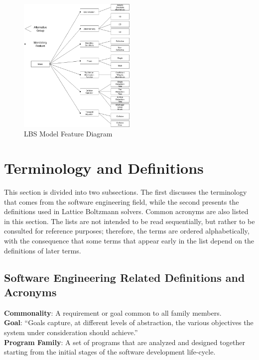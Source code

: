 \documentclass[12pt]{article}
\begin{document}
\begin{figure}[h!]
	\begin{center}
		\includegraphics[width=0.5\textwidth]{FeatureDiagramLBS}
		\caption{LBS Model Feature Diagram}
		\label{LBSFeatureDiagram}
	\end{center}
\end{figure} 

\newpage
\section{Terminology and Definitions}
This section is divided into two subsections. The first discusses the terminology that comes from the software engineering field, while the second presents the definitions used in Lattice Boltzmann solvers. Common acronyms are also listed in this section. The lists are not intended to be read sequentially, but rather to be consulted for reference purposes; therefore, the terms are ordered alphabetically, with the consequence that some terms that appear early in the list depend on the definitions of later terms.

\subsection{Software Engineering Related Definitions and Acronyms}
\noindent\textbf{Commonality}: A requirement or goal common to all family members.\\

\noindent\textbf{Goal}: “Goals capture, at different levels of abstraction, the various objectives the system under consideration should achieve.” \cite{van2001goal}\\

\noindent\textbf{Program Family}: A set of programs that are analyzed and designed together starting from the initial stages of the software development life-cycle.\\
\end{document}
